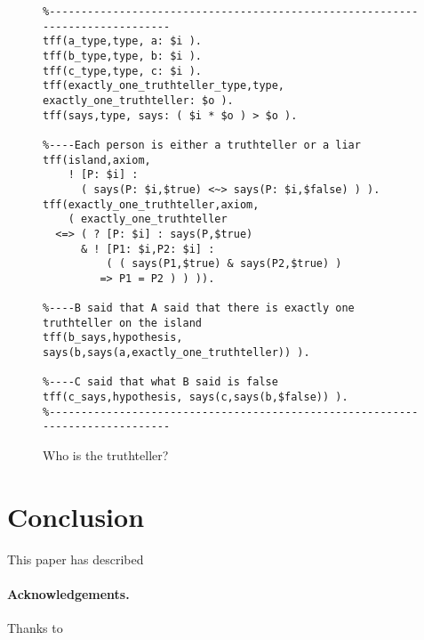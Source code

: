 \documentclass{easychair}
\begin{document}
\begin{figure}[htbp]
\begin{small}
\begin{verbatim}
%------------------------------------------------------------------------------
tff(a_type,type, a: $i ).
tff(b_type,type, b: $i ).
tff(c_type,type, c: $i ).
tff(exactly_one_truthteller_type,type, exactly_one_truthteller: $o ).
tff(says,type, says: ( $i * $o ) > $o ).

%----Each person is either a truthteller or a liar
tff(island,axiom,
    ! [P: $i] :
      ( says(P: $i,$true) <~> says(P: $i,$false) ) ).
tff(exactly_one_truthteller,axiom,
    ( exactly_one_truthteller
  <=> ( ? [P: $i] : says(P,$true)
      & ! [P1: $i,P2: $i] :
          ( ( says(P1,$true) & says(P2,$true) )
         => P1 = P2 ) ) )).

%----B said that A said that there is exactly one truthteller on the island
tff(b_says,hypothesis, says(b,says(a,exactly_one_truthteller)) ).

%----C said that what B said is false
tff(c_says,hypothesis, says(c,says(b,$false)) ).
%------------------------------------------------------------------------------
\end{verbatim}
\end{small}
\caption{Who is the truthteller?}
\label{Truthteller}
\end{figure}

\section{Conclusion}
\label{Conclusion}

This paper has described 

\paragraph{Acknowledgements.}
Thanks to 



\end{document}
